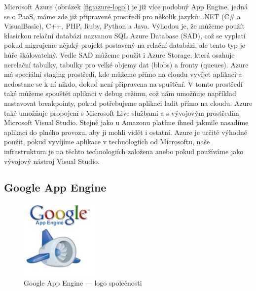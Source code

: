 Microsoft Azure (obrázek \ref{fig:azure-logo}) je již více podobný App Engine, jedná se o PaaS, máme zde již připravené prostředí pro několik jazyků: .NET (C\# a VisualBasic), C++, PHP, Ruby, Python a Java. Výhodou je, že můžeme použít klasickou relační databázi nazvanou SQL Azure Database (SAD), což se vyplatí pokud migrujeme nějaký projekt postavený na relační databázi, ale tento typ je hůře škálovatelný. Vedle SAD můžeme použít i Azure Storage, která osahuje nerelační tabulky, tabulky pro velké objemy dat (blobs) a fronty (queues). Azure má speciální staging prostředí, kde můžeme přímo na cloudu vyvíjet aplikaci a nedostane se k ní nikdo, dokud není připravena na spuštění. V tomto prostředí také můžeme spouštět aplikaci v debug režimu, což nám umožňuje například nastavovat breakpointy, pokud potřebujeme aplikaci ladit přímo na cloudu. Azure také umožňuje propojení s Microsoft Live službami a s vývojovým prostředím Microsoft Visual Studio. Stejně jako u Amazonu platíme ihned jakmile nasadíme aplikaci do plného provozu, aby ji mohli vidět i ostatní. Azure je určitě výhodné použít, pokud vyvíjíme aplikace v technologiích od Microsoftu, naše infrastruktura je na těchto technologiích založena anebo pokud používáme jako vývojový nástroj Visual Studio.

\subsection{Google App Engine}

\begin{figure}[h]
\begin{center}
\includegraphics[width=1.5in]{figures/app-engine-logo.jpg}
\caption[Google App Engine]{Google App Engine --- logo společnosti}
\label{fig:appengine-logo}
\end{center}
\end{figure}

